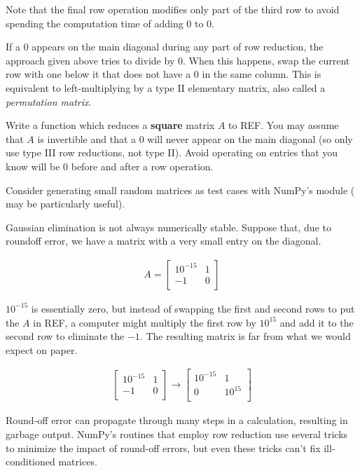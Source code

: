 Note that the final row operation modifies only part of the third row to avoid spending the computation time of adding $0$ to $0$.

If a $0$ appears on the main diagonal during any part of row reduction, the approach given above tries to divide by $0$.
When this happens, swap the current row with one below it that does not have a $0$ in the same column.
This is equivalent to left-multiplying by a type II elementary matrix, also called a \emph{permutation matrix}.

\begin{problem} %
Write a function which reduces a \textbf{square} matrix $A$ to REF.
You may assume that $A$ is invertible and that a $0$ will never appear on the main diagonal (so only use type III row reductions, not type II).
Avoid operating on entries that you know will be $0$ before and after a row operation.

Consider generating small random matrices as test cases with NumPy's  module ( may be particularly useful).
\label{prob:ref-row-reduction}
\end{problem}

\begin{warn} %
Gaussian elimination is not always numerically stable.
Suppose that, due to roundoff error, we have a matrix with a very small entry on the diagonal.

\begin{align*}
A = \left[\begin{array}{cc}
10^{-15} & 1 \\
-1 & 0 \\
\end{array}\right]
\end{align*}

$10^{-15}$ is essentially zero, but instead of swapping the first and second rows to put the $A$ in REF, a computer might multiply the first row by $10^{15}$ and add it to the second row to eliminate the $-1$.
The resulting matrix is far from what we would expect on paper.

\begin{align*}
\left[\begin{array}{cc}
10^{-15} & 1 \\
-1 & 0 \\
\end{array}\right]
\longrightarrow
\left[\begin{array}{cc}
10^{-15} & 1 \\
0 & 10^{15} \\
\end{array}\right]
\end{align*}

Round-off error can propagate through many steps in a calculation, resulting in garbage output.
NumPy's routines that employ row reduction use several tricks to minimize the impact of round-off errors, but even these tricks can't fix ill-conditioned matrices.
\end{warn}


